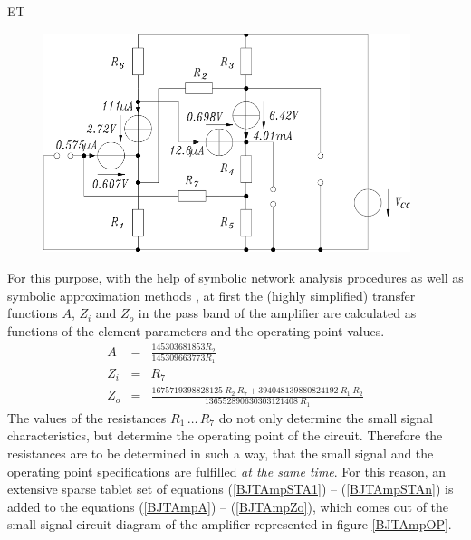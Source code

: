 \begin{example}{ET}
\begin {figure} [htbp]
\begin {center}
\includegraphics[height=6.4cm]{BJTAMPOP.png}
\caption {}%
\end {center}
\end {figure}
For this purpose, with the help of symbolic network analysis procedures \cite{RalfsDiss}  as well as symbolic approximation methods \cite{DA}, 
at first the (highly simplified)  transfer functions $A$, $Z_i$
and $Z_o$ in the pass band of the amplifier are calculated as functions of the element parameters and the operating point values.
\begin{eqnarray}
A   &=& \frac{145303681853 R_2}{145309663773 R_1}\label{BJTAmpA} \\
Z_i &=& R_7\\
Z_o &=& \frac{1675719398828125 \: R_2 \: R_7 
+ 394048139880824192 \: R_1 \: R_2}{136552890630303121408 \: R_1}
\label{BJTAmpZo}
\end{eqnarray}
The values of the resistances $R_1\, \ldots \, R_7$ do not only determine the small signal characteristics, but determine the operating point of the circuit. Therefore the resistances
are to be determined in such a way, that the small signal and the operating point specifications are fulfilled  {\em at the same time}. For this reason, an  extensive sparse tablet set of equations  (\ref{BJTAmpSTA1}) -- (\ref{BJTAmpSTAn}) is added to the equations (\ref{BJTAmpA}) -- (\ref{BJTAmpZo}), which comes out of the small signal circuit diagram of the amplifier represented in figure \ref{BJTAmpOP}.

\end{example}
